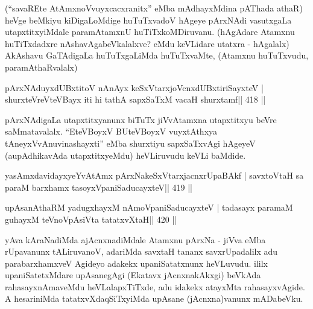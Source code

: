\begin{artha}
(``savaREte AtAmxnoVvuyxcacxranitx'' eMba mAdhayxMdina pAThada athaR) 
heVge beMkiyu kiDigaLoMdige huTuTxvadoV hAgeye pArxNAdi vasutxgaLa 
utapxtitxyiMdale paramAtamxnU huTiTxkoMDiruvanu. (hAgAdare Atamxnu 
huTiTxdadxre nAshavAgabeVkalalxve? eMdu keVLidare utatxra - hAgalalx)  \mdash  AkAshavu GaTAdigaLa huTuTxgaLiMda huTuTxvaMte, (Atamxnu huTuTxvudu, paramAthaRvalalx)
\end{artha}



\begin{shl}
pArxNAduyxdUBxtitoV nAnAyx keSxVtarxjoVcnxdUBxtiriSayxteV |
shurxteVreVteVBayx iti hi tathA sapxSaTxM vacaH shurxtamf\hfill || 418 ||
\end{shl}

\begin{artha}
pArxNAdigaLa utapxtitxyanunx biTuTx jiVvAtamxna utapxtitxyu beVre  saMmatavalalx. ``EteVBoyxV BUteVBoyxV vuyxtAthxya tAneyxVvAnuvinashayxti'' eMba shurxtiyu sapxSaTxvAgi hAgeyeV (aupAdhikavAda utapxtitxyeMdu) heVLiruvudu keVLi baMdide.
\end{artha}


\begin{shl}
yasAmxdavidayxyeYvA\s\s tAmx pArxNakeSxVtarxjacnxrUpaBAkf |
savxtoV\s taH sa paraM barxhamx tasoyxVpaniSaducayxteV\hfill || 419 ||
\end{shl}

\begin{shl}
upAsanAthaRM yadugxhayxM nAmoVpaniSaducayxteV |
tadasayx paramaM guhayxM teVnoVpAsiVta tatatxvXtaH\hfill || 420 ||
\end{shl}

\begin{artha}
yAva kAraNadiMda ajAcnxnadiMdale Atamxnu pArxNa - jiVva eMba   rUpavanunx tALiruvanoV, adariMda savxtaH tananx savxrUpadalilx adu  parabarxhamxveV Agideyo adakekx upaniSatatxnunx heVLuvudu. ililx  upaniSatetxMdare upAsanegAgi (Ekatavx jAcnxnakAkxgi) beVkAda rahasayxnAmaveMdu heVLalapxTiTxde, adu idakekx atayxMta rahasayxvAgide. A  hesariniMda tatatxvXdaqSiTxyiMda upAsane (jAcnxna)vanunx mADabeVku.
\end{artha}


